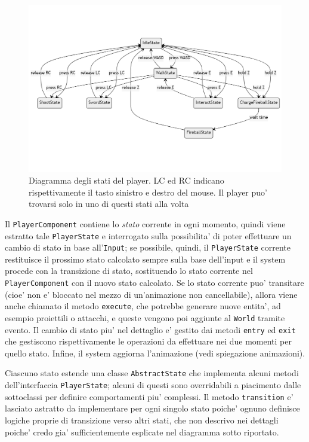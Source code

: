 \documentclass[a4paper,12pt]{report}
\begin{document}
\begin{figure}[h]
	\centering
	\includegraphics[width=\textwidth]{uml/player_states.png}
	\caption{Diagramma degli stati del player. LC ed RC indicano rispettivamente il tasto sinistro e destro del mouse. Il player puo' trovarsi solo in uno di questi stati alla volta} 
\end{figure}

Il \texttt{PlayerComponent} contiene lo \textit{stato} corrente in ogni momento, quindi viene estratto tale \texttt{PlayerState} e interrogato sulla possibilita' di poter effettuare un cambio di stato in base all'\texttt{Input}; se possibile, quindi, il \texttt{PlayerState} corrente restituisce il prossimo stato calcolato sempre sulla base dell'input e il system procede con la transizione di stato, sostituendo lo stato corrente nel \texttt{PlayerComponent} con il nuovo stato calcolato. Se lo stato corrente puo' transitare (cioe' non e' bloccato nel mezzo di un'animazione non cancellabile), allora viene anche chiamato il metodo \texttt{execute}, che potrebbe generare nuove entita', ad esempio proiettili o attacchi, e queste vengono poi aggiunte al \texttt{World} tramite evento. Il cambio di stato piu' nel dettaglio e' gestito dai metodi \texttt{entry} ed \texttt{exit} che gestiscono rispettivamente le operazioni da effettuare nei due momenti per quello stato. Infine, il system aggiorna l'animazione (vedi spiegazione animazioni). 

Ciascuno stato estende una classe \texttt{AbstractState} che implementa alcuni metodi dell'interfaccia \texttt{PlayerState}; alcuni di questi sono overridabili a piacimento dalle sottoclassi per definire comportamenti piu' complessi. Il metodo \texttt{transition} e' lasciato astratto da implementare per ogni singolo stato poiche' ognuno definisce logiche proprie di transizione verso altri stati, che non descrivo nei dettagli poiche' credo gia' sufficientemente esplicate nel diagramma sotto riportato.
\end{document}
